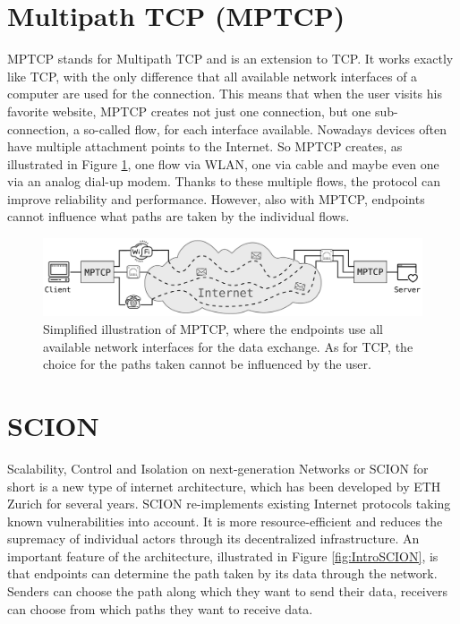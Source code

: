 \section{Multipath TCP (MPTCP)}

MPTCP stands for Multipath TCP and is an extension to TCP. It works exactly like TCP, with the only difference that all available network interfaces of a computer are used for the connection. This means that when the user visits his favorite website, MPTCP creates not just one connection, but one sub-connection, a so-called flow, for each interface available. Nowadays devices often have multiple attachment points to the Internet. So MPTCP creates, as illustrated in Figure \ref{fig:IntroMPTCP}, one flow via WLAN, one via cable and maybe even one via an analog dial-up modem. Thanks to these multiple flows, the protocol can improve reliability and performance. However, also with MPTCP, endpoints cannot influence what paths are taken by the individual flows. 

\begin{figure}[H]
	\begin{center}
		\def\svgwidth{1\textwidth}
		\includegraphics[scale=0.28]{../illustrations/introduction/MPTCPConnection.pdf}    
		\caption[]{Simplified illustration of MPTCP, where the endpoints use all available network interfaces for the data exchange. As for TCP, the choice for the paths taken cannot be influenced by the user.}
		\label{fig:IntroMPTCP}
	\end{center}
\end{figure}

\section{SCION}

Scalability, Control and Isolation on next-generation Networks or SCION for short is a new type of internet architecture, which has been developed by ETH Zurich for several years. SCION re-implements existing Internet protocols taking known vulnerabilities into account. It is more resource-efficient and reduces the supremacy of individual actors through its decentralized infrastructure. An important feature of the architecture, illustrated in Figure \ref{fig:IntroSCION}, is that endpoints can determine the path taken by its data through the network. Senders can choose the path along which they want to send their data, receivers can choose from which paths they want to receive data.


